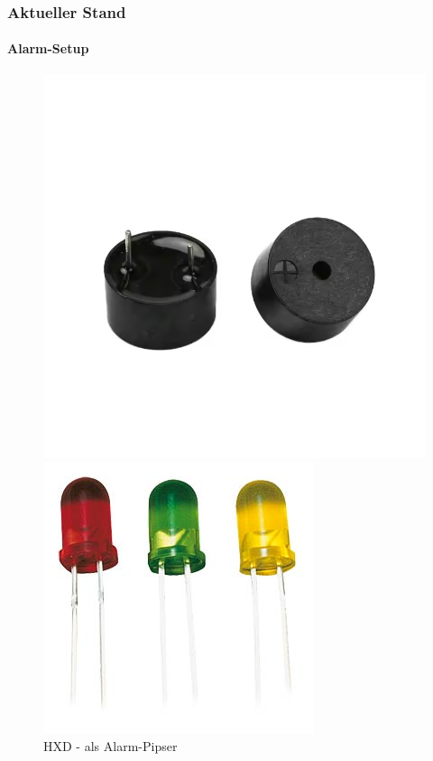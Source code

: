 \documentclass[]{beamer}
\begin{document}
\begin{frame}
	\frametitle{Aktueller Stand}
	\framesubtitle{Alarm-Setup}
	\begin{figure}
		\centering
		\begin{minipage}{0.32\textwidth}
			\centering
			\includegraphics[width=\textwidth]{Images/HXD_Buzzer_Pipser.png} 
			\caption{HXD - als Alarm-Pipser}
		\end{minipage}\hfill
		\begin{minipage}{0.32\textwidth}
			\centering
			\includegraphics[width=\textwidth]{Images/Leds.png} 

\end{minipage}
\end{figure}
\end{frame}
\end{document}

